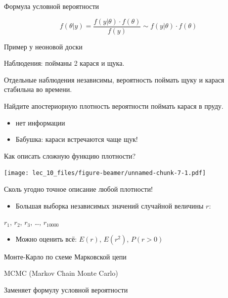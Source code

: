 \documentclass[ignorenonframetext,]{beamer}
\begin{document}
\begin{frame}{Формула условной вероятности}

\[
f(\theta|y)= \frac{f(y|\theta)\cdot f(\theta)}{f(y)} \sim f(y|\theta)\cdot f(\theta)
\]

\end{frame}

\begin{frame}{Пример у неоновой доски}

Наблюдения: пойманы 2 карася и щука.

Отдельные наблюдения независимы, вероятность поймать щуку и карася
стабильна во времени.

Найдите апостериорную плотность вероятности поймать карася в пруду.

\begin{itemize}
\item
  нет информации
\item
  Бабушка: караси встречаются чаще щук!
\end{itemize}

\end{frame}

\begin{frame}{Как описать сложную функцию плотности?}

\texttt{[image: lec\_10\_files/figure-beamer/unnamed-chunk-7-1.pdf]}

\end{frame}

\begin{frame}{Сколь угодно точное описание любой плотности!}

\begin{itemize}
\itemsep1pt\parskip0pt
\item
  Большая выборка независимых значений случайной величины \(r\):
\end{itemize}

\(r_1\), \(r_2\), \(r_3\), \ldots, \(r_{10000}\)

\begin{itemize}
\itemsep1pt\parskip0pt
\item
  Можно оценить всё: \(E(r)\), \(E(r^2)\), \(P(r>0)\)
\end{itemize}

\end{frame}

\begin{frame}{Монте-Карло по схеме Марковской цепи}

MCMC (Markov Chain Monte Carlo)

Заменяет формулу условной вероятности

\end{frame}
\end{document}
